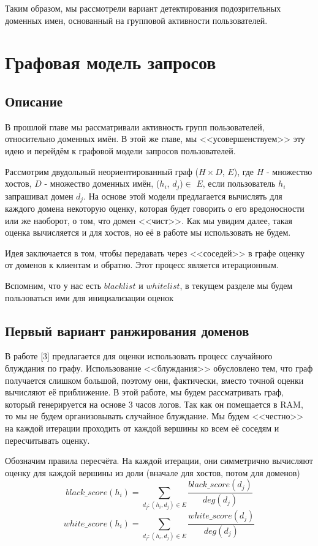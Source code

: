 \documentclass[14pt]{extreport}
\begin{document}
	Таким образом, мы рассмотрели вариант детектирования подозрительных доменных имен, основанный на групповой активности пользователей.
	
	\chapter{Графовая модель запросов}
	\label{chap:graph}
	\section{Описание}
	В прошлой главе мы рассматривали активность групп пользователей, относительно доменных имён. В этой же главе, мы <<усовершенствуем>> эту идею и перейдём к графовой модели запросов пользователей.
	
	Рассмотрим двудольный неориентированный граф ($H\times D$, $E$), где $H$ - множество хостов, $D$ - множество доменных имён, ($h_i$, $d_j$)$\in$ $E$, если пользователь $h_i$ запрашивал домен $d_j$. 
	На основе этой модели предлагается вычислять для каждого домена некоторую оценку, которая будет говорить о его вредоносности или же наоборот, о том, что домен <<чист>>. Как мы увидим далее, такая оценка вычисляется и для хостов, но её в работе мы использовать не будем.

	Идея заключается в том, чтобы передавать через <<соседей>> в графе оценку от доменов к клиентам и обратно. Этот процесс является итерационным.
	
			
	Вспомним, что у нас есть $blacklist$ и $whitelist$, в текущем разделе мы будем пользоваться ими для инициализации оценок
	\section{Первый вариант ранжирования доменов}
	В работе [3] предлагается для оценки использовать процесс случайного блуждания по графу. Использование <<блуждания>> обусловлено тем, что граф получается слишком большой, поэтому они, фактически, вместо точной оценки вычисляют её приближение. В этой работе, мы будем рассматривать граф, который генерируется на основе 3 часов логов. Так как он помещается в RAM, то мы не будем организовывать случайное блуждание. Мы будем <<честно>> на каждой итерации проходить от каждой вершины ко всем её соседям и пересчитывать оценку.

	Обозначим правила пересчёта. На каждой итерации, они симметрично вычисляют оценку для каждой вершины из доли (вначале для хостов, потом для доменов)
	\begin{equation}
	\label{eq:dr1-black}
	black\_score(h_i) = \sum_{d_j: (h_i, d_j)\in E} \frac{black\_score(d_j)}{deg(d_j)}
	\end{equation}
	\begin{equation}
	\label{eq:dr1-white}
	white\_score(h_i) = \sum_{d_j: (h_i, d_j)\in E} \frac{white\_score(d_j)}{deg(d_j)}
	\end{equation}
	
\end{document}
